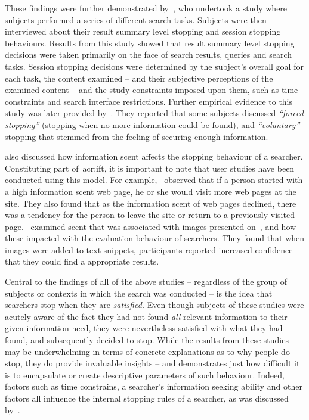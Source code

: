 These findings were further demonstrated by~\cite{wu2014information_scent}, who undertook a study where subjects performed a series of different search tasks. Subjects were then interviewed about their result summary level stopping and session stopping behaviours. Results from this study showed that result summary level stopping decisions were taken primarily on the face of search results, queries and search tasks. Session stopping decisions were determined by the subject's overall goal for each task, the content examined -- and their subjective perceptions of the examined content -- and the study constraints imposed upon them, such as time constraints and search interface restrictions. Further empirical evidence to this study was later provided by~\cite{wu2014stopping_query_abandonment}. They reported that some subjects discussed \emph{``forced stopping''} (stopping when no more information could be found), and \emph{``voluntary''} stopping that stemmed from the feeling of securing enough information.

\cite{wu2014information_scent} also discussed how information scent affects the stopping behaviour of a searcher. Constituting part of~\gls{acr:ift}, it is important to note that user studies have been conducted using this model. For example,~\cite{card2001scent_graphs} observed that if a person started with a high information scent web page, he or she would visit more web pages at the site. They also found that as the information scent of web pages declined, there was a tendency for the person to leave the site or return to a previously visited page.~\cite{loumakis2011image_smells} examined scent that was associated with images presented on~, and how these impacted with the evaluation behaviour of searchers. They found that when images were added to text snippets, participants reported increased confidence that they could find a appropriate results.

Central to the findings of all of the above studies -- regardless of the group of subjects or contexts in which the search was conducted -- is the idea that searchers stop when they are \emph{satisfied.} Even though subjects of these studies were acutely aware of the fact they had not found \emph{all} relevant information to their given information need, they were nevertheless satisfied with what they had found, and subsequently decided to stop. While the results from these studies may be underwhelming in terms of concrete explanations as to why people do stop, they do provide invaluable insights -- and demonstrates just how difficult it is to encapsulate or create descriptive parameters of such behaviour. Indeed, factors such as time constrains, a searcher's information seeking ability and other factors all influence the internal stopping rules of a searcher, as was discussed by~\cite{marchionini1995information_seeking}. 

